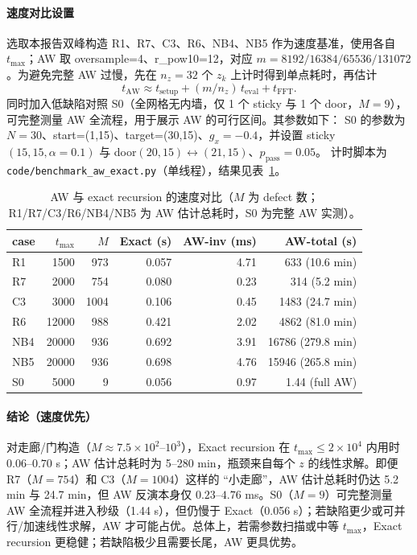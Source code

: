 \documentclass[11pt,fontset=fandol]{ctexart}
\begin{document}
\paragraph{速度对比设置}
选取本报告双峰构造 R1、R7、C3、R6、NB4、NB5 作为速度基准，使用各自 $t_{\max}$；AW 取 oversample=4、r\_pow10=12，对应 $m=8192/16384/65536/131072$。为避免完整 AW 过慢，先在 $n_z=32$ 个 $z_k$ 上计时得到单点耗时，再估计
\[
  t_{\mathrm{AW}}\approx t_{\mathrm{setup}} + (m/n_z)\,t_{\mathrm{eval}} + t_{\mathrm{FFT}}.
\]
同时加入低缺陷对照 S0（全网格无内墙，仅 1 个 sticky 与 1 个 door，$M=9$），可完整测量 AW 全流程，用于展示 AW 的可行区间。其参数如下：
S0 的参数为 $N=30$、start=(1,15)、target=(30,15)、$g_x=-0.4$，并设置 sticky$(15,15,\alpha=0.1)$ 与 door$(20,15)\leftrightarrow(21,15)$、$p_{\text{pass}}=0.05$。
计时脚本为 \texttt{code/benchmark\_aw\_exact.py}（单线程），结果见表~\ref{tab:aw-speed}。

\begin{table}[!htbp]
  \centering
  \begin{tabular}{lrrrrr}
    \toprule
    case & $t_{\max}$ & $M$ & Exact (s) & AW-inv (ms) & AW-total (s) \\
    \midrule
    R1  & 1500  & 973 & 0.057 & 4.71 & 633 (10.6 min) \\
    R7  & 2000  & 754 & 0.080 & 0.23 & 314 (5.2 min) \\
    C3  & 3000  & 1004 & 0.106 & 0.45 & 1483 (24.7 min) \\
    R6  & 12000 & 988 & 0.421 & 2.02 & 4862 (81.0 min) \\
    NB4 & 20000 & 936 & 0.692 & 3.91 & 16786 (279.8 min) \\
    NB5 & 20000 & 936 & 0.698 & 4.76 & 15946 (265.8 min) \\
    S0  & 5000  & 9   & 0.056 & 0.97 & 1.44 (full AW) \\
    \bottomrule
  \end{tabular}
  \caption{AW 与 exact recursion 的速度对比（$M$ 为 defect 数；R1/R7/C3/R6/NB4/NB5 为 AW 估计总耗时，S0 为完整 AW 实测）。}
  \label{tab:aw-speed}
\end{table}

\paragraph{结论（速度优先）}
对走廊/门构造（$M\approx 7.5\times 10^2$--$10^3$），Exact recursion 在 $t_{\max}\le 2\times 10^4$ 内用时 $0.06$--$0.70$ s；AW 估计总耗时为 5--280 min，瓶颈来自每个 $z$ 的线性求解。即便 R7（$M=754$）和 C3（$M=1004$）这样的 ``小走廊''，AW 估计总耗时仍达 5.2 min 与 24.7 min，但 AW 反演本身仅 $0.23$--$4.76$ ms。S0（$M=9$）可完整测量 AW 全流程并进入秒级（1.44 s），但仍慢于 Exact（0.056 s）；若缺陷更少或可并行/加速线性求解，AW 才可能占优。总体上，若需参数扫描或中等 $t_{\max}$，Exact recursion 更稳健；若缺陷极少且需要长尾，AW 更具优势。
\end{document}
